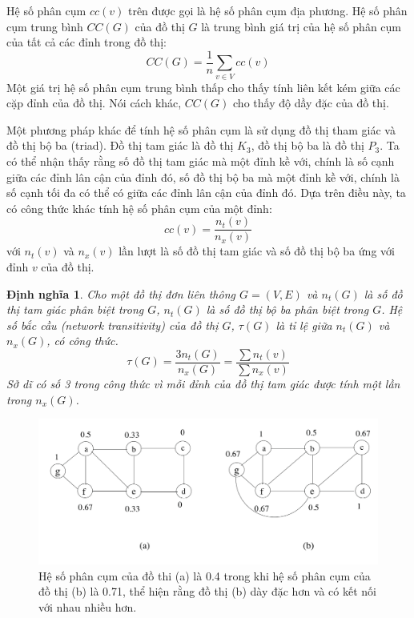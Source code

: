 \documentclass[14pt, oneside, a4paper, openany]{scrartcl}
\newtheorem{definition}{Định nghĩa}[section]
\begin{document}
Hệ số phân cụm $cc(v)$ trên được gọi là hệ số phân cụm địa phương. Hệ số phân cụm trung bình $CC(G)$ của đồ thị $G$ là trung bình giá trị của hệ số phân cụm của tất cả các đỉnh trong đồ thị:
\begin{equation}
	CC(G) = \frac{1}{n}\sum_{v \in V}cc(v)
\end{equation}
Một giá trị hệ số phân cụm trung bình thấp cho thấy tính liên kết kém giữa các cặp đỉnh của đồ thị. Nói cách khác, $CC(G)$ cho thấy độ dầy đặc của đồ thị.

Một phương pháp khác để tính hệ số phân cụm là sử dụng đồ thị tham giác và đồ thị bộ ba (triad). Đồ thị tam giác là đồ thị $K_3$, đồ thị bộ ba là đồ thị $P_3$. Ta có thể nhận thấy rằng số đồ thị tam giác mà một đỉnh kề với, chính là số cạnh giữa các đỉnh lân cận của đỉnh đó, số đồ thị bộ ba mà một đỉnh kề với, chính là số cạnh tối đa có thể có giữa các đỉnh lân cận của đỉnh đó.
Dựa trên điều này, ta có công thức khác tính hệ số phân cụm của một đỉnh:
\begin{equation}
	cc(v) = \frac{n_t(v)}{n_x(v)}
\end{equation}
với $n_t(v)$ và $n_x(v)$ lần lượt là số đồ thị tam giác và số đồ thị bộ ba ứng với đỉnh $v$ của đồ thị.

\begin{definition}
	\cite{complexnetwork} Cho một đồ thị đơn liên thông $G = (V,E)$ và $n_t(G)$ là số đồ thị tam giác phân biệt trong $G$, $n_t(G)$ là số đồ thị bộ ba phân biệt trong $G$. Hệ số bắc cầu  (network transitivity) của đồ thị $G$, $\tau(G)$ là tỉ lệ giữa $n_t(G)$ và $n_x(G)$, có công thức.
	\begin{equation}
		\tau(G) = \frac{3n_t(G)}{n_x(G)} = \frac{\sum n_t(v)}{\sum n_x(v)}
	\end{equation}
	Sở dĩ có số 3 trong công thức vì mỗi đỉnh của đồ thị tam giác được tính một lần trong $n_x(G)$.
\end{definition}

\begin{figure}[!h]
	\centering
	\includegraphics[scale=0.5]{figures/clustercoefficient.png} 
	\caption[Hệ số phân cụm]{Hệ số phân cụm của đồ thi (a) là 0.4 trong khi hệ số phân cụm của đồ thị (b) là 0.71, thể hiện rằng đồ thị (b) dày đặc hơn và có kết nối với nhau nhiều hơn.}
	\label{fig:clustercoeff}
\end{figure}
\end{document}
